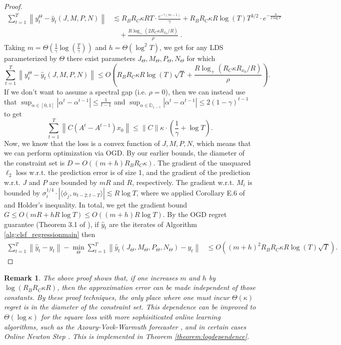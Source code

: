 \documentclass[11pt]{article}
\newcommand{\norm}[1]{\left\lVert#1\right\rVert}
\newtheorem{remark}[theorem]{Remark}
\numberwithin{equation}{section}
\begin{document}
\begin{proof}
\begin{align*}
    \sum_{t=1}^T\norm{y_t^\Theta - \hat{y}_t(J, M, P, N)} &\lesssim R_BR_C \kappa R T\cdot \frac{e^{-\gamma (m-1)}}{\gamma} + R_BR_C \kappa R \log(T) T^{3/2} \cdot e^{-\frac{h}{2 \log T}} \\ &\quad + \frac{ R \log_+(2R_C \kappa R_{x_0} / R)}{\rho}\;.
\end{align*}
Taking $m = \Theta\left(\frac{1}{\gamma} \log\left(\frac{T}{\gamma}\right)\right)$ and $h = \Theta\left(\log^2T\right)$, we get for any LDS parameterized by $\Theta$ there exist parameters $J_\Theta, M_\Theta, P_\Theta, N_\Theta$ for which
$$\sum_{t=1}^T \norm{y_t^\Theta - \hat{y}_t(J, M, P, N)} \leq O\left(R_B R_C \kappa R \log(T) \sqrt{T} +\frac{ R\log_+(R_C \kappa R_{x_0} / R)}{\rho}\right).$$
If we don't want to assume a spectral gap (i.e. $\rho = 0$), then we can instead use that $\sup_{\alpha \in [0, 1]} |\alpha^t - \alpha^{t-1}| \leq \frac{1}{t-1}$ and $\sup_{\alpha \in \mathbb{D}_{1-\gamma}} |\alpha^t - \alpha^{t-1}| \leq 2(1-\gamma)^{t-1}$ to get
$$\sum_{t=1}^T\norm{C(A^t - A^{t-1})x_0} \leq \|C\| \kappa \cdot \left(\frac{1}{\gamma} + \log T\right).$$
Now, we know that the loss is a convex function of $J, M, P, N$, which means that we can perform optimization via OGD. By our earlier bounds, the diameter of the constraint set is $D = O((m+h) R_B R_C \kappa)$. The gradient of the unsquared $\ell_2$ loss w.r.t. the prediction error is of size 1, and the gradient of the prediction w.r.t. $J$ and $P$ are bounded by $mR$ and $R$, respectively. The gradient w.r.t. $M_i$ is bounded by $\sigma_i^{1/4} \cdot |\langle \phi_j, u_{t-2:t-T}\rangle| \lesssim R \log T$, where we applied Corollary E.6 of \cite{hazan2017learning} and Holder's inequality. In total, we get the gradient bound $G \leq O(mR + hR \log T) \leq O((m+h)R\log T)$. By the OGD regret guarantee (Theorem 3.1 of \cite{hazan2016introduction}), if $\hat{y}_t$ are the iterates of Algorithm \ref{alg:clsf_regressionmain} then
\begin{align*}\sum_{t=1}^T \norm{\hat{y}_t - y_t} - \min_{\Theta} \sum_{t = 1}^T \norm{\hat{y}_t(J_\Theta, M_\Theta, P_\Theta, N_\Theta) - y_t} &\leq O\left((m+h)^2 R_B R_C \kappa R \log(T) \sqrt{T}\right).\end{align*}
\end{proof}
\begin{remark}
    The above proof shows that, if one increases $m$ and $h$ by $\log( R_B R_C \kappa R)$, then the approximation error can be made independent of those constants. By these proof techniques, the only place where one must incur $\Theta(\kappa)$ regret is in the diameter of the constraint set. 
    This dependence can be improved to $\Theta(\log \kappa)$ for the square loss with more sophisiticated online learning algorithms, such as the Azoury-Vovk-Warmuth forecaster \cite{azoury2001relative}, and in certain cases Online Newton Step \cite{hazan2016introduction}. This is implemented in Theorem \ref{theorem:logdependence}.
\end{remark}
\end{document}
